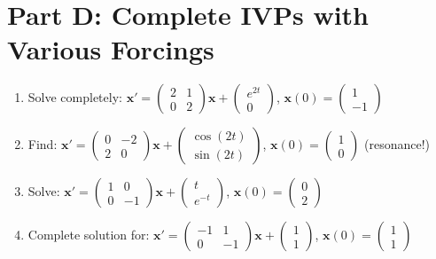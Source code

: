 \documentclass[12pt]{article}
\begin{document}
\section*{Part D: Complete IVPs with Various Forcings}

\begin{enumerate}[start=16]
\item Solve completely: $\mathbf{x}' = \begin{pmatrix} 2 & 1 \\ 0 & 2 \end{pmatrix}\mathbf{x} + \begin{pmatrix} e^{2t} \\ 0 \end{pmatrix}$, $\mathbf{x}(0) = \begin{pmatrix} 1 \\ -1 \end{pmatrix}$

\item Find: $\mathbf{x}' = \begin{pmatrix} 0 & -2 \\ 2 & 0 \end{pmatrix}\mathbf{x} + \begin{pmatrix} \cos(2t) \\ \sin(2t) \end{pmatrix}$, $\mathbf{x}(0) = \begin{pmatrix} 1 \\ 0 \end{pmatrix}$ (resonance!)

\item Solve: $\mathbf{x}' = \begin{pmatrix} 1 & 0 \\ 0 & -1 \end{pmatrix}\mathbf{x} + \begin{pmatrix} t \\ e^{-t} \end{pmatrix}$, $\mathbf{x}(0) = \begin{pmatrix} 0 \\ 2 \end{pmatrix}$

\item Complete solution for: $\mathbf{x}' = \begin{pmatrix} -1 & 1 \\ 0 & -1 \end{pmatrix}\mathbf{x} + \begin{pmatrix} 1 \\ 1 \end{pmatrix}$, $\mathbf{x}(0) = \begin{pmatrix} 1 \\ 1 \end{pmatrix}$


\end{enumerate}
\end{document}
